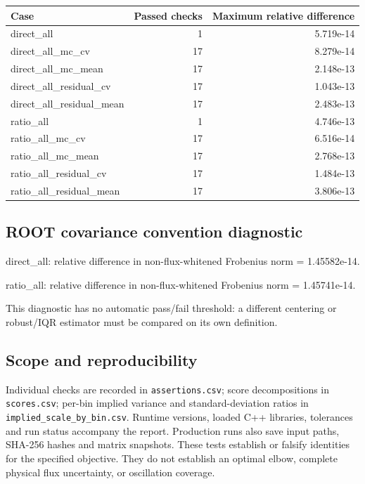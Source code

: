 \begin{center}\small\begin{tabular}{lrr}\toprule

Case & Passed checks & Maximum relative difference\\\midrule

direct\_all & 1 & 5.719e-14\\

direct\_all\_mc\_cv & 17 & 8.279e-14\\

direct\_all\_mc\_mean & 17 & 2.148e-13\\

direct\_all\_residual\_cv & 17 & 1.043e-13\\

direct\_all\_residual\_mean & 17 & 2.483e-13\\

ratio\_all & 1 & 4.746e-13\\

ratio\_all\_mc\_cv & 17 & 6.516e-14\\

ratio\_all\_mc\_mean & 17 & 2.768e-13\\

ratio\_all\_residual\_cv & 17 & 1.484e-13\\

ratio\_all\_residual\_mean & 17 & 3.806e-13\\

\bottomrule\end{tabular}\end{center}

\subsection{ROOT covariance convention diagnostic}

direct\_all: relative difference in non-flux-whitened Frobenius norm = 1.45582e-14.\par

ratio\_all: relative difference in non-flux-whitened Frobenius norm = 1.45741e-14.\par

This diagnostic has no automatic pass/fail threshold: a different centering or robust/IQR estimator must be compared on its own definition.

\subsection{Scope and reproducibility}

Individual checks are recorded in \texttt{assertions.csv}; score decompositions in \texttt{scores.csv}; per-bin implied variance and standard-deviation ratios in \texttt{implied\_scale\_by\_bin.csv}. Runtime versions, loaded C++ libraries, tolerances and run status accompany the report. Production runs also save input paths, SHA-256 hashes and matrix snapshots. These tests establish or falsify identities for the specified objective. They do not establish an optimal elbow, complete physical flux uncertainty, or oscillation coverage.
